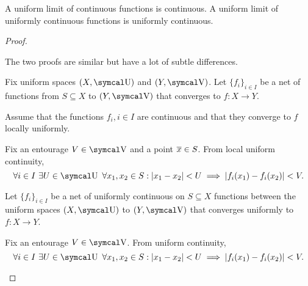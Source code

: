 \begin{proposition}\label{def:uniform_limit_of_continuous_functions}
  \mbox{}
  \begin{thmenum}
     A uniform limit of continuous functions is continuous.
     A uniform limit of uniformly continuous functions is uniformly continuous.
  \end{thmenum}
\end{proposition}
\begin{proof}
  \begin{description}
    The two proofs are similar but have a lot of subtle differences.

    Fix uniform spaces \( (X, \U) \) and \( (Y, \V) \). Let \( \{ f_i \}_{i \in I} \) be a net of functions from \( S \subseteq X \) to \( (Y, \V) \) that converges to \( f: X \to Y \).

     Assume that the functions \( f_i, i \in I \) are continuous and that they converge to \( f \) locally uniformly.

    Fix an entourage \( V \in \V \) and a point \( \overline{x} \in S \). From local uniform continuity,
    \begin{equation*}
      \forall i \in I \ \exists U \in \U \ \forall x_1, x_2 \in S : \Abs{x_1 - x_2} < U \implies \Abs{f_i(x_1) - f_i(x_2)} < V.
    \end{equation*}

     Let \( \{ f_i \}_{i \in I} \) be a net of uniformly continuous on \( S \subseteq X \) functions between the uniform spaces \( (X, \U) \) to \( (Y, \V) \) that converges uniformly to \( f: X \to Y \).

    Fix an entourage \( V \in \V \). From uniform continuity,
    \begin{equation*}
      \forall i \in I \ \exists U \in \U \ \forall x_1, x_2 \in S : \Abs{x_1 - x_2} < U \implies \Abs{f_i(x_1) - f_i(x_2)} < V.
    \end{equation*}


\end{description}
\end{proof}
